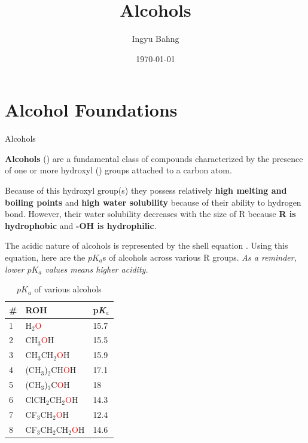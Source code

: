 \documentclass[10pt]{article}
\title{Alcohols}
\date{\today}
\author{Ingyu Bahng}
\begin{document}


\section{Alcohol Foundations}

  \begin{core}{Alcohols}
  
    \textbf{Alcohols} () are a fundamental class of compounds characterized by the presence of one or more hydroxyl () groups attached to a carbon atom.

    Because of this hydroxyl group(s) they possess relatively \textbf{high melting and boiling points} and \textbf{high water solubility} because of their ability to hydrogen bond. However, their water solubility decreases with the size of R because \textbf{R is hydrophobic} and \textbf{-OH is hydrophilic}.

  \end{core}

  The acidic nature of alcohols is represented by the shell equation . Using this equation, here are the $pK_a$s of alcohols across various R groups. \textit{As a reminder, lower $pK_a$ values means higher acidity.}

  \begin{table}[H]
    \centering
    \begin{tabular}{lll}
      \hline
      \# & \textbf{ROH} & \textbf{p\textit{K}$_a$} \\
      \hline
      1 & H$_2$\textcolor{red}{O} & 15.7 \\
      2 & CH$_3$\textcolor{red}{O}H & 15.5 \\
      3 & CH$_3$CH$_2$\textcolor{red}{O}H & 15.9 \\
      4 & (CH$_3$)$_2$CH\textcolor{red}{O}H & 17.1 \\
      5 & (CH$_3$)$_3$C\textcolor{red}{O}H & 18 \\
      6 & \textcolor{green!60!black}{Cl}CH$_2$CH$_2$\textcolor{red}{O}H & 14.3 \\
      7 & C\textcolor{green!60!black}{F}$_3$CH$_2$\textcolor{red}{O}H & 12.4 \\
      8 & C\textcolor{green!60!black}{F}$_3$CH$_2$CH$_2$\textcolor{red}{O}H & 14.6 \\
    \end{tabular}
    \caption{$pK_a$ of various alcohols}
    \label{tab:pka_alc}
  \end{table}
\end{document}
